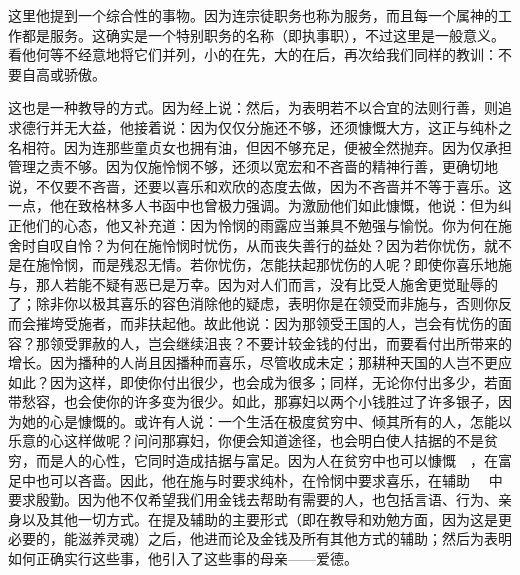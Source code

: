  \par

这里他提到一个综合性的事物。因为连宗徒职务也称为服务，而且每一个属神的工作都是服务。这确实是一个特别职务的名称（即执事职），不过这里是一般意义。看他何等不经意地将它们并列，小的在先，大的在后，再次给我们同样的教训：不要自高或骄傲。\par

 \par

这也是一种教导的方式。因为经上说：\newline{}然后，为表明若不以合宜的法则行善，则追求德行并无大益，他接着说：因为仅仅分施还不够，还须慷慨大方，这正与纯朴之名相符。因为连那些童贞女也拥有油，但因不够充足，便被全然抛弃。因为仅承担管理之责不够。因为仅施怜悯不够，还须以宽宏和不吝啬的精神行善，更确切地说，不仅要不吝啬，还要以喜乐和欢欣的态度去做，因为不吝啬并不等于喜乐。这一点，他在致格林多人书函中也曾极力强调。为激励他们如此慷慨，他说：但为纠正他们的心态，他又补充道：因为怜悯的雨露应当兼具不勉强与愉悦。你为何在施舍时自叹自怜？为何在施怜悯时忧伤，从而丧失善行的益处？因为若你忧伤，就不是在施怜悯，而是残忍无情。若你忧伤，怎能扶起那忧伤的人呢？即使你喜乐地施与，那人若能不疑有恶已是万幸。因为对人们而言，没有比受人施舍更觉耻辱的了；除非你以极其喜乐的容色消除他的疑虑，表明你是在领受而非施与，否则你反而会摧垮受施者，而非扶起他。故此他说：因为那领受王国的人，岂会有忧伤的面容？那领受罪赦的人，岂会继续沮丧？不要计较金钱的付出，而要看付出所带来的增长。因为播种的人尚且因播种而喜乐，尽管收成未定；那耕种天国的人岂不更应如此？因为这样，即使你付出很少，也会成为很多；同样，无论你付出多少，若面带愁容，也会使你的许多变为很少。如此，那寡妇以两个小钱胜过了许多银子，因为她的心是慷慨的。\newline{}或许有人说：一个生活在极度贫穷中、倾其所有的人，怎能以乐意的心这样做呢？问问那寡妇，你便会知道途径，也会明白使人拮据的不是贫穷，而是人的心性，它同时造成拮据与富足。因为人在贫穷中也可以慷慨　，在富足中也可以吝啬。因此，他在施与时要求纯朴，在怜悯中要求喜乐，在辅助　 中要求殷勤。因为他不仅希望我们用金钱去帮助有需要的人，也包括言语、行为、亲身以及其他一切方式。在提及辅助的主要形式（即在教导和劝勉方面，因为这是更必要的，能滋养灵魂）之后，他进而论及金钱及所有其他方式的辅助；然后为表明如何正确实行这些事，他引入了这些事的母亲——爱德。\par


